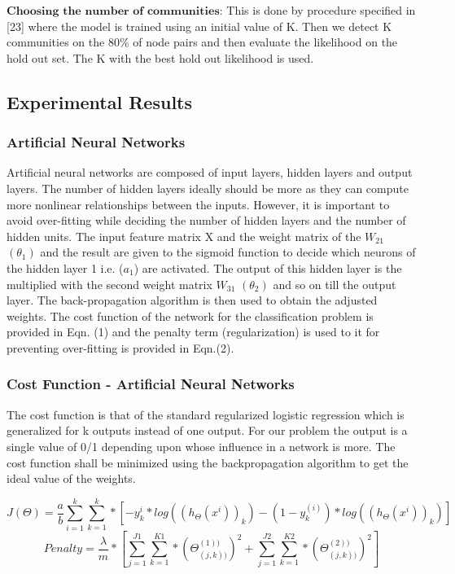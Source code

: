 \documentclass[conference]{IEEEtran}
\begin{document}
$\textbf{Choosing the number of communities:}$ This is done by
procedure specified in [23] where the model is trained using
an initial value of K. Then we detect K communities on the
80\% of node pairs and then evaluate the likelihood on the hold
out set. The K with the best hold out likelihood is used.

\subsection{Experimental Results}

\subsubsection{Artificial Neural Networks}
Artificial neural networks are composed of input layers, hidden layers and output layers. The number of hidden layers ideally should be more as they can compute more nonlinear relationships between the inputs. However, it is important to avoid over-fitting while deciding the number of hidden layers and the number of hidden units. The input feature matrix X and the weight matrix of the $W_{21}$ $(\theta_{1})$ and the result are given to the sigmoid function to decide which neurons of the hidden layer 1 i.e. ($a_{1}$) are activated. The output of this hidden layer is the multiplied with the second weight matrix $W_{31}$ $(\theta_{2})$ and so on till the output layer. The back-propagation algorithm is then used to obtain the adjusted weights. The cost function of the network for the classification problem is provided in Eqn. (1) and the penalty term (regularization) is used to it for preventing over-fitting is provided in Eqn.(2).\\



\subsubsection{Cost Function - Artificial Neural Networks}

The cost function is that of the standard regularized logistic regression which is generalized for k outputs instead of one output. For our problem the output is a single value of 0/1 depending upon whose influence in a network is more. The cost function shall be minimized using the backpropagation algorithm to get the ideal value of the weights.

\begin{equation}
J(\Theta ) = \frac{a}{b} \sum_{i=1}^{k}\sum_{k=1}^{k} * [-y_{k}^{i}*log((h_{\Theta }(x^{i}))_{k}) - (1-y_{k}^{(i)})*log((h_{\Theta }(x^{i}))_{k})] 
\end{equation}
\begin{equation}
Penalty =  \frac{\lambda }{m}* [\sum_{j=1}^{J1}\sum_{k=1}^{K1}*(\Theta _{(j,k))}^{(1))})^{2} + \sum_{j=1}^{J2}\sum_{k=1}^{K2}*(\Theta _{(j,k))}^{(2))})^{2}]
\end{equation}
\end{document}
